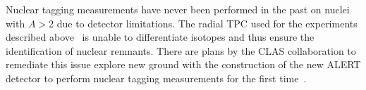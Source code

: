 Nuclear tagging measurements have never been performed in the past
on nuclei with $A>2$ due to detector limitations. The radial TPC used 
for the experiments described above~\cite{Baillie:2011za}
is unable to differentiate isotopes and thus ensure the identification of 
nuclear remnants. There are plans by the CLAS collaboration to remediate this issue
explore new ground with the construction of the new ALERT detector to perform nuclear tagging measurements 
for the first time~\cite{Armstrong:2017zqr,Armstrong:2017zcm}.

